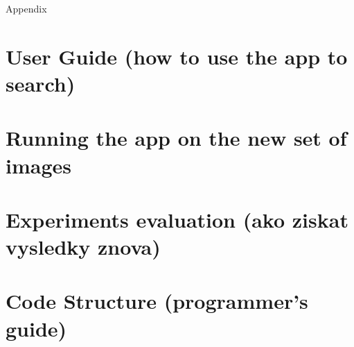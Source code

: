 Appendix
\chapter{User Guide (how to use the app to search)}
\chapter{ Running the app on the new set of images}
\chapter{Experiments evaluation (ako ziskat vysledky znova)}
\chapter{Code Structure (programmer's guide)}




